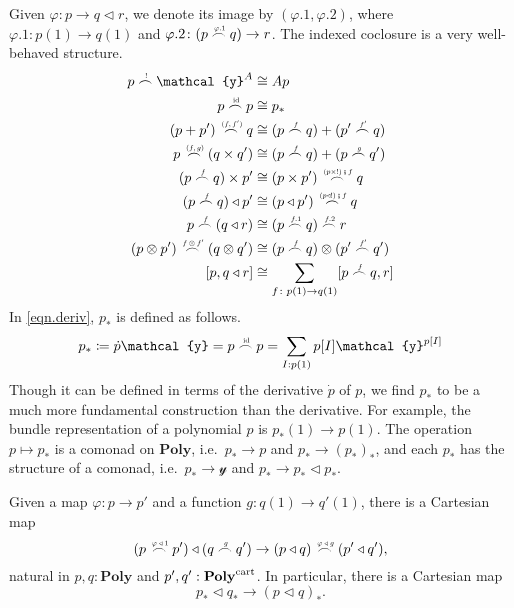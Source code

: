 \documentclass[11pt, one side, article]{memoir}
\theoremstyle{definition}
\theoremstyle{plain}
\newcommand{\Cat}[1]{\mathbf{#1}}%
\newcommand{\id}{\mathrm{id}}
\newcommand{\then}{\mathbin{\fatsemi}}
\newcommand{\tn}[1]{\textnormal{#1}}
\newcommand{\yon}{\mathcal{y}}
\newcommand{\poly}{\Cat{Poly}}
\newcommand{\polycart}{\poly^{\tn{cart}}}
\newcommand{\0}{\textsf{0}}
\newcommand{\1}{\tn{\textsf{1}}}
\newcommand{\tri}{\mathbin{\triangleleft}}
\newcommand{\indexcoclscale}[1]{\scalebox{.7}{#1}}
\newcommand{\cocl}[1]{
	\scriptsize\overset{\,\indexcoclscale{$#1$}}{\frown}\normalsize
}
\begin{document}
Given $\varphi\colon p\to q\tri r$, we denote its image by $(\varphi.1,\varphi.2)$, where $\varphi.1\colon p(1)\to q(1)$ and $\varphi.2\colon (p\cocl{\varphi.1}q)\to r$. The indexed coclosure is a very well-behaved structure.
\begin{align}
	p\cocl{!}\yon^A&\cong Ap\\
	p\cocl{\id}p&\cong p_*\label{eqn.deriv}\\
	(p+p')\cocl{(f,f')}q&\cong(p\cocl{f}q)+(p'\cocl{f'}q)\\
	p\cocl{(f,g)}(q\times q')&\cong(p\cocl{f}q)+(p\cocl{g}q')\\
	(p\cocl{f}q)\times p'&\cong(p\times p')\cocl{(p\times!)\then f}q\\
	(p\cocl{f}q)\tri p'&\cong(p\tri p')\cocl{(p\tri!)\then f}q\\
	p\cocl{f}(q\tri r)&\cong(p\cocl{f.1}q)\cocl{f.2}r\\
	(p\otimes p')\cocl{f\otimes f'}(q\otimes q')&\cong(p\cocl{f}q)\otimes(p'\cocl{f'}q')\\
	[p,q\tri r]&\cong\sum_{f\colon p(1)\to q(1)}[p\cocl{f}q,r]
\end{align}
In \eqref{eqn.deriv}, $p_*$ is defined as follows.
\begin{equation}
p_*\coloneqq \dot{p}\yon=p\cocl{\id}p=\sum_{I: p(1)}p[I]\yon^{p[I]}
\end{equation}
Though it can be defined in terms of the derivative $\dot{p}$ of $p$, we find $p_*$ to be a much more fundamental construction than the derivative. For example, the bundle representation of a polynomial $p$ is $p_*(1)\to p(1)$. The operation $p\mapsto p_*$ is a comonad on $\poly$, i.e.\ $p_*\to p$ and $p_*\to (p_*)_*$, and each $p_*$ has the structure of a comonad, i.e.\ $p_*\to\yon$ and $p_*\to p_*\tri p_*$. 

Given a map $\varphi\colon p\to p'$ and a function $g\colon q(1)\to q'(1)$, there is a Cartesian map
\begin{equation}
	(p\cocl{\varphi\tri1}p')\tri(q\cocl{g}q')\to
	(p\tri q)\cocl{\varphi\tri g}(p'\tri q'),
\end{equation}
natural in $p,q:\poly$ and $p',q':\polycart$. In particular, there is a Cartesian map
\begin{equation}
	p_*\tri q_*\to(p\tri q)_*.
\end{equation}
\end{document}
